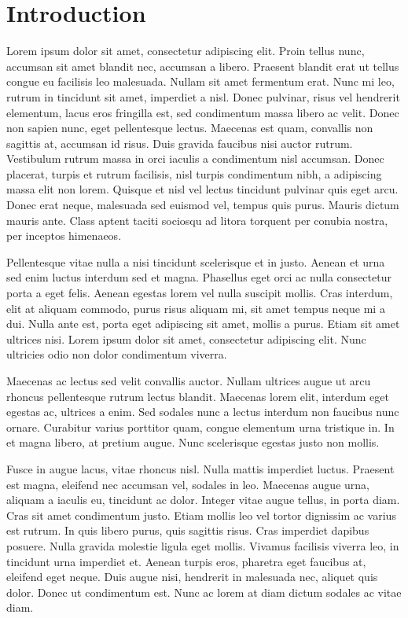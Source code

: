 \chapter{Introduction}

Lorem ipsum dolor sit amet, consectetur adipiscing elit. Proin tellus nunc, accumsan sit amet blandit nec, accumsan a libero. Praesent blandit erat ut tellus congue eu facilisis leo malesuada. Nullam sit amet fermentum erat. Nunc mi leo, rutrum in tincidunt sit amet, imperdiet a nisl. Donec pulvinar, risus vel hendrerit elementum, lacus eros fringilla est, sed condimentum massa libero ac velit. Donec non sapien nunc, eget pellentesque lectus. Maecenas est quam, convallis non sagittis at, accumsan id risus. Duis gravida faucibus nisi auctor rutrum. Vestibulum rutrum massa in orci iaculis a condimentum nisl accumsan. Donec placerat, turpis et rutrum facilisis, nisl turpis condimentum nibh, a adipiscing massa elit non lorem. Quisque et nisl vel lectus tincidunt pulvinar quis eget arcu. Donec erat neque, malesuada sed euismod vel, tempus quis purus. Mauris dictum mauris ante. Class aptent taciti sociosqu ad litora torquent per conubia nostra, per inceptos himenaeos.

Pellentesque vitae nulla a nisi tincidunt scelerisque et in justo. Aenean et urna sed enim luctus interdum sed et magna. Phasellus eget orci ac nulla consectetur porta a eget felis. Aenean egestas lorem vel nulla suscipit mollis. Cras interdum, elit at aliquam commodo, purus risus aliquam mi, sit amet tempus neque mi a dui. Nulla ante est, porta eget adipiscing sit amet, mollis a purus. Etiam sit amet ultrices nisi. Lorem ipsum dolor sit amet, consectetur adipiscing elit. Nunc ultricies odio non dolor condimentum viverra.

Maecenas ac lectus sed velit convallis auctor. Nullam ultrices augue ut arcu rhoncus pellentesque rutrum lectus blandit. Maecenas lorem elit, interdum eget egestas ac, ultrices a enim. Sed sodales nunc a lectus interdum non faucibus nunc ornare. Curabitur varius porttitor quam, congue elementum urna tristique in. In et magna libero, at pretium augue. Nunc scelerisque egestas justo non mollis.

Fusce in augue lacus, vitae rhoncus nisl. Nulla mattis imperdiet luctus. Praesent est magna, eleifend nec accumsan vel, sodales in leo. Maecenas augue urna, aliquam a iaculis eu, tincidunt ac dolor. Integer vitae augue tellus, in porta diam. Cras sit amet condimentum justo. Etiam mollis leo vel tortor dignissim ac varius est rutrum. In quis libero purus, quis sagittis risus. Cras imperdiet dapibus posuere. Nulla gravida molestie ligula eget mollis. Vivamus facilisis viverra leo, in tincidunt urna imperdiet et. Aenean turpis eros, pharetra eget faucibus at, eleifend eget neque. Duis augue nisi, hendrerit in malesuada nec, aliquet quis dolor. Donec ut condimentum est. Nunc ac lorem at diam dictum sodales ac vitae diam.

